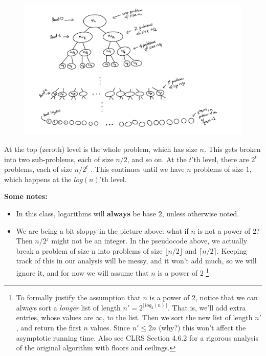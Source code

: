 \documentclass [12pt]{article}
\begin{document}
\begin{figure}[h!]
\centering{}
\includegraphics[scale=0.75]{mergesort_tree.png}
\end{figure}

At the top (zeroth) level is the whole problem, which has size $n$. This gets broken into two sub-problems, each of size $n/2$, and so on. At the $t$'th level, there are $2^t$ problems, each of size $n/2^t$
. This continues until we have $n$ problems of size $1$, which happens at the $log(n)$'th level.

\textbf{Some notes:}

\begin{itemize}
\item In this class, logarithms will \textbf{always} be base $2$, unless otherwise noted.
\item We are being a bit sloppy in the picture above: what if $n$ is not a power of $2$? Then $n/2^j$ might not be an integer. In the pseudocode above, we actually break a problem of size n into problems of size $\lfloor n/2 \rfloor$ and $\lceil n/2 \rceil$. Keeping track of this in our analysis will be messy, and it won't add much, so we will ignore it, and for now we will assume that $n$ is a power of $2$ \footnote{To formally justify the assumption that $n$ is a power of $2$, notice that we can always sort a \textit{longer} list of length $n' = 2^{\lceil log_2(n) \rceil}$. That is, we'll add extra entries, whose values are $\infty$, to the list. Then we sort the new list of length $n'$, and return the first $n$ values. Since $n' \leq 2n$ (why?) this won't affect the asymptotic running time. Also see CLRS Section 4.6.2 for a rigorous analysis of the original algorithm with floors and ceilings.}
\end{itemize}
\end{document}
